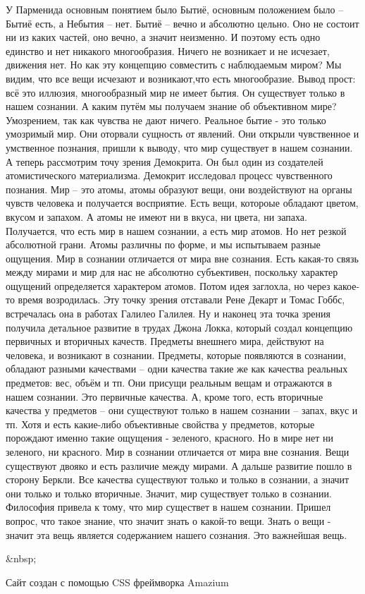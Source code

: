     У Парменида основным понятием было Бытиё, основным положением было – Бытиё есть, а Небытия – нет. Бытиё – вечно и абсолютно цельно. Оно не состоит ни из каких частей, оно вечно, а значит неизменно. И поэтому есть одно единство и нет никакого многообразия. Ничего не возникает и не исчезает, движения нет. Но как эту концепцию совместить с наблюдаемым миром? Мы видим, что все вещи исчезают и возникают,что есть многообразие. Вывод прост: всё это иллюзия, многообразный мир не имеет бытия. Он существует только в нашем сознании. А каким путём мы получаем знание об объективном мире? Умозрением, так как чувства не дают ничего. Реальное бытие - это только умозримый мир. Они оторвали сущность от явлений. Они открыли чувственное и умственное познания, пришли к выводу, что мир существует в нашем сознании. А теперь рассмотрим точу зрения Демокрита. Он был один из создателей атомистического материализма. Демокрит исследовал процесс чувственного познания. Мир – это атомы, атомы образуют вещи, они воздействуют на органы чувств человека и получается восприятие. Есть вещи, котороые обладают цветом, вкусом и запахом. А атомы не имеют ни в вкуса, ни цвета, ни запаха. Получается, что есть мир в нашем сознании, а есть мир атомов. Но нет резкой абсолютной грани. Атомы различны по форме, и мы испытываем разные ощущения. Мир в сознании отличается от мира вне сознания. Есть какая-то связь между мирами и мир для нас не абсолютно субъективен, поскольку характер ощущений определяется характером атомов. Потом идея заглохла, но через какое-то время возродилась. Эту точку зрения отставали Рене Декарт и Томас Гоббс, встречалась она в работах Галилео Галилея. Ну и наконец эта точка зрения получила детальное развитие в трудах Джона Локка, который создал концепцию первичных и вторичных качеств. Предметы внешнего мира, действуют на человека, и возникают в сознании. Предметы, которые появляются в сознании, обладают разными качествами – одни качества такие же как качества реальных предметов: вес, объём и тп. Они присущи реальным вещам и отражаются в нашем сознании. Это первичные качества. А, кроме того, есть вторичные качества у предметов – они существуют только в нашем сознании – запах, вкус и тп. Хотя и есть какие-либо объективные свойства у предметов, которые порождают именно такие ощущения - зеленого, красного. Но в мире нет ни зеленого, ни красного. Мир в сознании отличается от мира вне сознания. Вещи существуют двояко и есть различие между мирами. А дальше развитие пошло в сторону Беркли. Все качества существуют только и только в сознании, а значит они только и только вторичные. Значит, мир существует только в сознании. Философия привела к тому, что мир существет в нашем сознании. Пришел вопрос, что такое знание, что значит знать о какой-то вещи. Знать о вещи - значит эта вещь является содержанием нашего сознания. Это важнейшая вещь.

&nbsp;

Сайт создан с помощью CSS фреймворка Amazium
